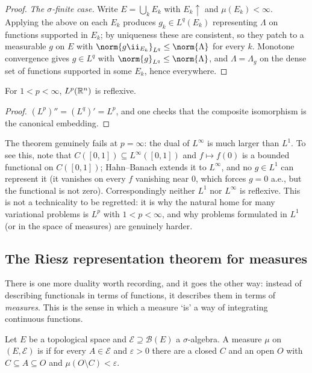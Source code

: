 \documentclass[a4paper]{scrartcl}
\begin{document}
\begin{proof}
	\emph{The $\sigma$-finite case.} Write $E = \bigcup_k E_k$ with $E_k \uparrow$ and $\mu(E_k) < \infty$. Applying the above on each $E_k$ produces $g_k \in L^q(E_k)$ representing $\Lambda$ on functions supported in $E_k$; by uniqueness these are consistent, so they patch to a measurable $g$ on $E$ with $\norm{g \ii_{E_k}}_{L^q}\le\norm{\Lambda}$ for every $k$. Monotone convergence gives $g \in L^q$ with $\norm{g}_{L^q}\le\norm{\Lambda}$, and $\Lambda = \Lambda_g$ on the dense set of functions supported in some $E_k$, hence everywhere.
\end{proof}

\begin{corollary}\label{cor:lpreflexive}
	For $1 < p < \infty$, $L^p(\mathbb{R}^n)$ is reflexive.
\end{corollary}

\begin{proof}
	$(L^p)'' = (L^q)' = L^p$, and one checks that the composite isomorphism is the canonical embedding.
\end{proof}

The theorem genuinely fails at $p = \infty$: the dual of $L^\infty$ is much larger than $L^1$. To see this, note that $C([0,1]) \subseteq L^\infty([0,1])$ and $f \mapsto f(0)$ is a bounded functional on $C([0,1])$; Hahn--Banach extends it to $L^\infty$, and no $g \in L^1$ can represent it (it vanishes on every $f$ vanishing near $0$, which forces $g = 0$ a.e., but the functional is not zero). Correspondingly neither $L^1$ nor $L^\infty$ is reflexive. This is not a technicality to be regretted: it is why the natural home for many variational problems is $L^p$ with $1 < p< \infty$, and why problems formulated in $L^1$ (or in the space of measures) are genuinely harder.

\subsection{The Riesz representation theorem for measures}

There is one more duality worth recording, and it goes the other way: instead of describing functionals in terms of functions, it describes them in terms of \emph{measures}. This is the sense in which a measure `is' a way of integrating continuous functions.

\begin{definition}
	Let $E$ be a topological space and $\mathcal{E} \supseteq \mathcal{B}(E)$ a $\sigma$-algebra. A measure $\mu$ on $(E,\mathcal{E})$ is  if for every $A \in \mathcal{E}$ and $\varepsilon > 0$ there are a closed $C$ and an open $O$ with $C \subseteq A \subseteq O$ and $\mu(O \setminus C) < \varepsilon$.
\end{definition}
\end{document}
